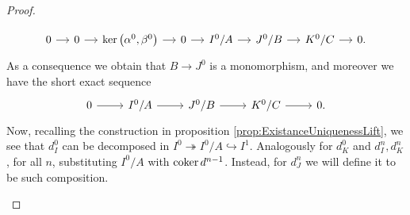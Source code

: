 \documentclass[../Main]{subfiles}
\begin{document}
\begin{proof}
\begin{enumerate}
		\begin{equation}
		\begin{tikzcd}[column sep=small]
			0 \arrow[r, "", rightarrow] &
			0 \arrow[r, "", rightarrow] &
			\ker \left(\alpha^0, \beta^0\right) \arrow[r, "", rightarrow] &
			0 \arrow[r, "", rightarrow] &
			I^0/A \arrow[r, "", rightarrow] &
			J^0/B \arrow[r, "", rightarrow] &
			K^0/C \arrow[r, "", rightarrow] &
			0.
		\end{tikzcd}
		\end{equation} 
		As a consequence we obtain that $B \to J^0$ is a monomorphism, and moreover
		we have the short exact sequence
		\begin{equation}
		\begin{tikzcd}
			0 \arrow[r, "", rightarrow] &
			I^0/A \arrow[r, "", rightarrow] &
			J^0/B \arrow[r, "", rightarrow] &
			K^0/C \arrow[r, "", rightarrow] &
			0.
		\end{tikzcd}
		\end{equation} 
		Now, recalling the construction in proposition \ref{prop:ExistanceUniquenessLift},
		we see that $d^0_I$ can be decomposed in $I^0 \twoheadrightarrow I^0/A \hookrightarrow I^1$.
		Analogously for $d^0_K$ and $d^n_I, d^n_K$, for all $n$, substituting $I^0/A$ with
		$\operatorname{coker} d^{n-1}$.
		Instead, for $d^n_J$ we will define it to be such composition.


\end{enumerate}
\end{proof}
\end{document}
